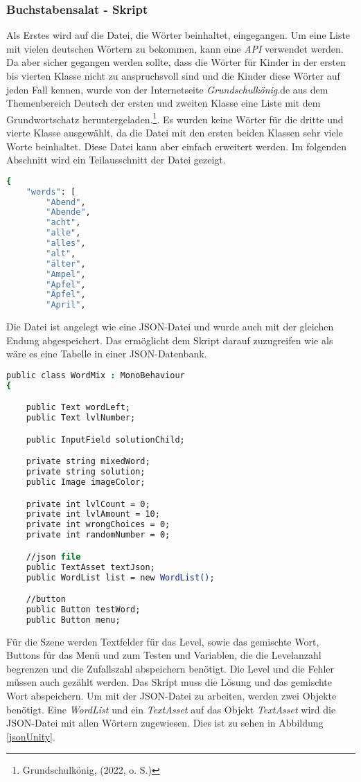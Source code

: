 \subsubsection{Buchstabensalat - Skript}
Als Erstes wird auf die Datei, die Wörter beinhaltet, eingegangen. Um eine Liste mit vielen deutschen Wörtern zu bekommen, kann eine \textit{API} verwendet werden. Da aber sicher gegangen werden sollte, dass die Wörter für Kinder in der ersten bis vierten Klasse nicht zu anspruchsvoll sind und die Kinder diese Wörter auf jeden Fall kennen, wurde von der Internetseite \textit{Grundschulkönig}.de aus dem Themenbereich Deutsch der ersten und zweiten Klasse eine Liste mit dem Grundwortschatz heruntergeladen.\footnote{Grundschulkönig, (2022, o. S.)}. Es wurden keine Wörter für die dritte und vierte Klasse ausgewählt, da die Datei mit den ersten beiden Klassen sehr viele Worte beinhaltet. Diese Datei kann aber einfach erweitert werden. Im folgenden Abschnitt wird ein Teilausschnitt der Datei gezeigt. 
\begin{lstlisting}[language=csh, caption={Wortdatei}]
{
	"words": [
		"Abend",
		"Abende",
		"acht",
		"alle",
		"alles",
		"alt",
		"älter",
		"Ampel",
		"Apfel",
		"Äpfel",
		"April",
\end{lstlisting}
Die Datei ist angelegt wie eine JSON-Datei und wurde auch mit der gleichen Endung abgespeichert. Das ermöglicht dem Skript darauf zuzugreifen wie als wäre es eine Tabelle in einer JSON-Datenbank.\\
\begin{lstlisting}[language=csh, caption={WordMix.cs Variablendeklaration}]
public class WordMix : MonoBehaviour
{

	public Text wordLeft;
	public Text lvlNumber;

	public InputField solutionChild;

	private string mixedWord;
	private string solution;
	public Image imageColor;

	private int lvlCount = 0;
	private int lvlAmount = 10;
	private int wrongChoices = 0;
	private int randomNumber = 0;

	//json file
	public TextAsset textJson;
	public WordList list = new WordList();

	//button
	public Button testWord;
	public Button menu;
\end{lstlisting}
Für die Szene werden Textfelder für das Level, sowie das gemischte Wort, Buttons für das Menü und zum Testen und Variablen, die die Levelanzahl begrenzen und die Zufallszahl abspeichern benötigt. Die Level und die Fehler müssen auch gezählt werden. Das Skript muss die Lösung und das gemischte Wort abspeichern. Um mit der JSON-Datei zu arbeiten, werden zwei Objekte benötigt. Eine \textit{WordList} und ein \textit{TextAsset} auf das Objekt \textit{TextAsset} wird die JSON-Datei mit allen Wörtern zugewiesen. Dies ist zu sehen in Abbildung \ref{jsonUnity}. 
